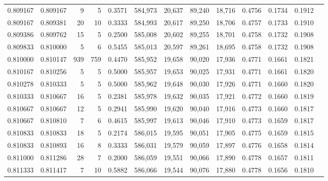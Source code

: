 \begin{tabular}{rrrrrrrrrrrrr}
0.809167 & 0.809167 &     9 &   5 &                                     0.3571 & 584,973 &  20,637 &  89,240 &  18,716 & 0.4756 & 0.1734 & 0.1912 \\
0.809167 & 0.809381 &    20 &  10 &                                     0.3333 & 584,993 &  20,617 &  89,250 &  18,706 & 0.4757 & 0.1733 & 0.1910 \\
0.809386 & 0.809762 &    15 &   5 &                                     0.2500 & 585,008 &  20,602 &  89,255 &  18,701 & 0.4758 & 0.1732 & 0.1908 \\
0.809833 & 0.810000 &     5 &   6 &                                     0.5455 & 585,013 &  20,597 &  89,261 &  18,695 & 0.4758 & 0.1732 & 0.1908 \\
0.810000 & 0.810147 &   939 & 759 &                                     0.4470 & 585,952 &  19,658 &  90,020 &  17,936 & 0.4771 & 0.1661 & 0.1821 \\
0.810167 & 0.810256 &     5 &   5 &                                     0.5000 & 585,957 &  19,653 &  90,025 &  17,931 & 0.4771 & 0.1661 & 0.1820 \\
0.810278 & 0.810333 &     5 &   5 &                                     0.5000 & 585,962 &  19,648 &  90,030 &  17,926 & 0.4771 & 0.1660 & 0.1820 \\
0.810333 & 0.810667 &    16 &   5 &                                     0.2381 & 585,978 &  19,632 &  90,035 &  17,921 & 0.4772 & 0.1660 & 0.1819 \\
0.810667 & 0.810667 &    12 &   5 &                                     0.2941 & 585,990 &  19,620 &  90,040 &  17,916 & 0.4773 & 0.1660 & 0.1817 \\
0.810667 & 0.810810 &     7 &   6 &                                     0.4615 & 585,997 &  19,613 &  90,046 &  17,910 & 0.4773 & 0.1659 & 0.1817 \\
0.810833 & 0.810833 &    18 &   5 &                                     0.2174 & 586,015 &  19,595 &  90,051 &  17,905 & 0.4775 & 0.1659 & 0.1815 \\
0.810833 & 0.810893 &    16 &   8 &                                     0.3333 & 586,031 &  19,579 &  90,059 &  17,897 & 0.4776 & 0.1658 & 0.1814 \\
0.811000 & 0.811286 &    28 &   7 &                                     0.2000 & 586,059 &  19,551 &  90,066 &  17,890 & 0.4778 & 0.1657 & 0.1811 \\
0.811333 & 0.811417 &     7 &  10 &                                     0.5882 & 586,066 &  19,544 &  90,076 &  17,880 & 0.4778 & 0.1656 & 0.1810 \\

\end{tabular}
